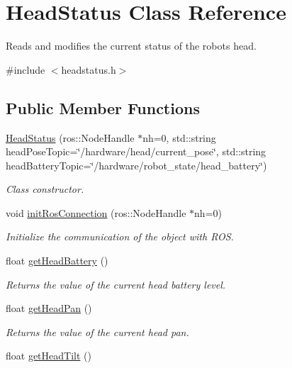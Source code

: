 \hypertarget{class_head_status}{}\section{Head\+Status Class Reference}
\label{class_head_status}


Reads and modifies the current status of the robot\textquotesingle{}s head.  




{\ttfamily \#include $<$headstatus.\+h$>$}

\subsection*{Public Member Functions}
\begin{DoxyCompactItemize}
\item 
\hyperlink{class_head_status_a9315fac3e7b7e2a93427a6e803c93ed9}{Head\+Status} (ros\+::\+Node\+Handle $\ast$nh=0, std\+::string head\+Pose\+Topic=\char`\"{}/hardware/head/current\+\_\+pose\char`\"{}, std\+::string head\+Battery\+Topic=\char`\"{}/hardware/robot\+\_\+state/head\+\_\+battery\char`\"{})
\begin{DoxyCompactList}\small\item\em Class constructor. \end{DoxyCompactList}\item 
void \hyperlink{class_head_status_af482b42420d6347e5bff1ae667cea754}{init\+Ros\+Connection} (ros\+::\+Node\+Handle $\ast$nh=0)
\begin{DoxyCompactList}\small\item\em Initialize the communication of the object with R\+OS. \end{DoxyCompactList}\item 
float \hyperlink{class_head_status_a2f4da46d8db94b6bcc1bfc2b7e38e800}{get\+Head\+Battery} ()
\begin{DoxyCompactList}\small\item\em Returns the value of the current head battery level. \end{DoxyCompactList}\item 
float \hyperlink{class_head_status_a06c359a7b1ed7a594a0b34912af1a030}{get\+Head\+Pan} ()
\begin{DoxyCompactList}\small\item\em Returns the value of the current head pan. \end{DoxyCompactList}\item 
float \hyperlink{class_head_status_a514dc6720510539a3dd7d686a1b200bf}{get\+Head\+Tilt} ()

\end{DoxyCompactItemize}
